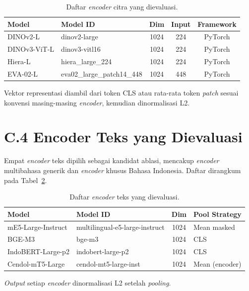 \begin{table}[htbp]
\centering
\caption{Daftar \textit{encoder} citra yang dievaluasi.}
\label{tab:image-encoders}
\small
\begin{tabular}{p{2.5cm} p{5.0cm} c c c}
\toprule
\textbf{Model} & \textbf{Model ID} & \textbf{Dim} & \textbf{Input} & \textbf{Framework} \\
\midrule
DINOv2-L & dinov2-large & 1024 & 224 & PyTorch \\
DINOv3-ViT-L & dinov3-vitl16 & 1024 & 224 & PyTorch \\
Hiera-L & hiera\_large\_224 & 1024 & 224 & PyTorch \\
EVA-02-L & eva02\_large\_patch14\_448 & 1024 & 448 & PyTorch \\
\bottomrule
\end{tabular}
\end{table}

Vektor representasi diambil dari token CLS atau rata-rata token \textit{patch} sesuai konvensi masing-masing \textit{encoder}, kemudian dinormalisasi L2.

\section*{C.4 Encoder Teks yang Dievaluasi}

Empat \textit{encoder} teks dipilih sebagai kandidat ablasi, mencakup \textit{encoder} multibahasa generik dan \textit{encoder} khusus Bahasa Indonesia. Daftar dirangkum pada Tabel~\ref{tab:text-encoders}.

\begin{table}[htbp]
\centering
\caption{Daftar \textit{encoder} teks yang dievaluasi.}
\label{tab:text-encoders}
\small
\begin{tabular}{p{3.2cm} p{5.0cm} c p{2.8cm}}
\toprule
\textbf{Model} & \textbf{Model ID} & \textbf{Dim} & \textbf{Pool Strategy} \\
\midrule
mE5-Large-Instruct & multilingual-e5-large-instruct & 1024 & Mean masked \\
BGE-M3 & bge-m3 & 1024 & CLS \\
IndoBERT-Large-p2 & indobert-large-p2 & 1024 & CLS \\
Cendol-mT5-Large & cendol-mt5-large-inst & 1024 & Mean (encoder) \\
\bottomrule
\end{tabular}
\end{table}

\textit{Output} setiap \textit{encoder} dinormalisasi L2 setelah \textit{pooling}.

